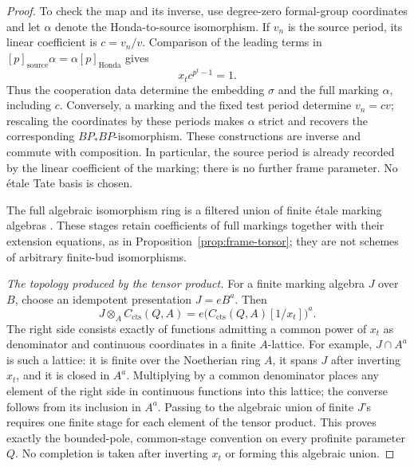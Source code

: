 \begin{proof}
To check the map and its inverse, use degree-zero formal-group
coordinates and let \(\alpha\) denote the Honda-to-source
isomorphism. If \(v_n\) is the source period, its linear coefficient
is \(c=v_n/v\). Comparison of the leading terms in
\([p]_{\mathrm{source}}\alpha=\alpha[p]_{\mathrm{Honda}}\)
gives
\[
x_t c^{p^t-1}=1.
\]
Thus the cooperation data determine the embedding \(\sigma\) and
the full marking \(\alpha\), including \(c\). Conversely, a marking
and the fixed test period determine \(v_n=cv\); rescaling the
coordinates by these periods makes \(\alpha\) strict and recovers
the corresponding \(BP_*BP\)-isomorphism. These constructions are
inverse and commute with composition. In particular, the source
period is already recorded by the linear coefficient of the marking;
there is no further frame parameter. No \'etale Tate basis is chosen.

The full algebraic isomorphism ring is a filtered union
of finite \'etale marking algebras
\cite[Lecture~14, Theorem~1]{LurieFormalGroups}.
These stages retain coefficients of full markings together with their
extension equations, as in Proposition~\ref{prop:frame-torsor}; they
are not schemes of arbitrary finite-bud isomorphisms.

\emph{The topology produced by the tensor product.}
For a finite marking algebra \(J\) over \(B\), choose an idempotent
presentation \(J=eB^a\). Then
\begin{equation}
J\otimes_A C_{\mathrm{cts}}(Q,A)
=e\bigl(C_{\mathrm{cts}}(Q,A)[1/x_t]\bigr)^a.
\label{spec:bounded-functions}
\end{equation}
The right side consists exactly of functions admitting a common
power of \(x_t\) as denominator and continuous coordinates in a
finite \(A\)-lattice. For example, \(J\cap A^a\) is such a
lattice: it is finite over the Noetherian ring \(A\), it spans
\(J\) after inverting \(x_t\), and it is closed in \(A^a\).
Multiplying by a common denominator places any element of the right
side in continuous functions into this lattice; the converse follows
from its inclusion in \(A^a\). Passing to the algebraic union of
finite \(J\)'s requires one finite stage for each element of the
tensor product. This proves exactly the bounded-pole, common-stage
convention on every profinite parameter \(Q\). No completion is
taken after inverting \(x_t\) or forming this algebraic union.


\end{proof}
